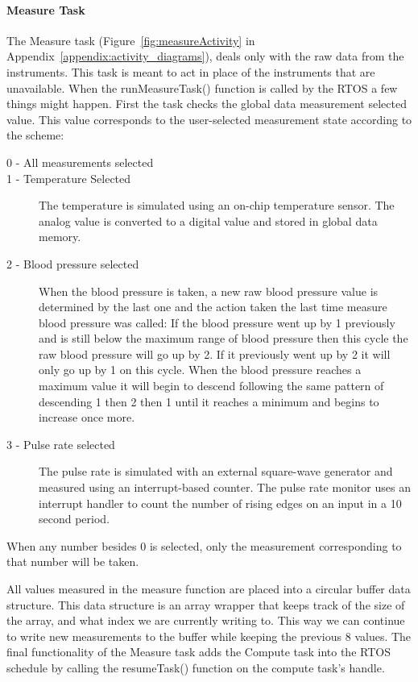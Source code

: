 \documentclass[12pt]{article} %
\begin{document}
\paragraph{Measure Task} The Measure task (Figure~\ref{fig:measureActivity}
in Appendix~\ref{appendix:activity_diagrams}), deals only with the raw data from the
instruments. This task is meant to act in place of the instruments that are
unavailable.  When the runMeasureTask() function is called by the RTOS a few things might happen. First the task checks the global data measurement selected value. 
This value corresponds to the user-selected measurement state according to the scheme:
\begin{description}
	\item[0 - All measurements selected]
	\item[1 - Temperature Selected] The temperature is simulated using an on-chip temperature sensor. The analog value is converted to a digital value and stored in global data memory.
	\item[2 - Blood pressure selected] When the blood pressure is taken, a new raw blood pressure value is determined by the last one and the action taken the last time measure blood pressure was called:
If the blood pressure went up by 1 previously and is still below the maximum range of blood pressure then this cycle the raw blood pressure will go up by 2. If it previously went up by 2 it will only go up by 1 on this cycle.
When the blood pressure reaches a maximum value it will begin to descend following the same pattern of descending 1 then 2 then 1 until it reaches a minimum and begins to increase once more.
	\item[3 - Pulse rate selected] The pulse rate is simulated with an external
		square-wave generator and measured using an interrupt-based counter. The
		pulse rate monitor uses an interrupt handler to count the number of
rising edges on an input in a 10 second period. 
\end{description}

When any number besides 0 is selected, only the measurement corresponding to that number will be taken.

All values measured in the measure function are placed into a circular buffer data structure. This data structure is an array wrapper that keeps track of the size of the array, and what index we are currently
writing to. This way we can continue to write new measurements to the buffer while keeping the previous 8 values.
The final functionality of the Measure task adds the Compute task into the RTOS schedule by calling the resumeTask() function on the compute task's handle.
\end{document}
